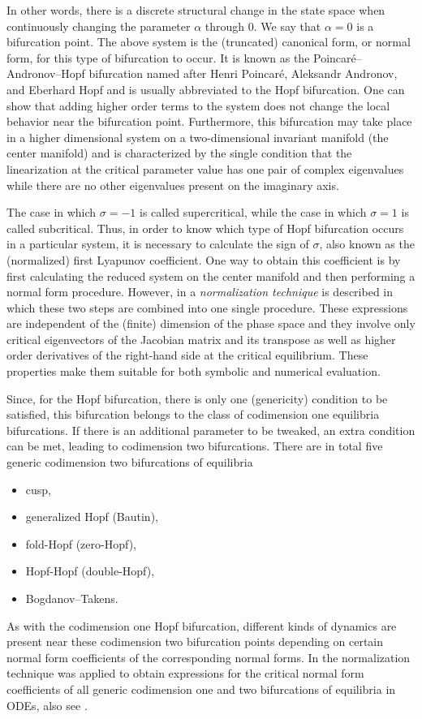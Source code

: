 In other words, there is a discrete structural change in the state space when
continuously changing the parameter $\alpha$ through $0$. We say that
$\alpha=0$ is a bifurcation point. The above system is the (truncated)
canonical form, or normal form, for this type of bifurcation to occur. It is
known as the Poincar\'e–Andronov–Hopf bifurcation named after Henri Poincar\'e,
Aleksandr Andronov, and Eberhard Hopf and is usually abbreviated to the Hopf
bifurcation. One can show that adding higher order terms to the system does
not change the local behavior near the bifurcation point. Furthermore, this
bifurcation may take place in a higher dimensional system on a two-dimensional
invariant manifold (the center manifold) and is characterized by the single
condition that the linearization at the critical parameter value has one pair
of complex eigenvalues while there are no other eigenvalues present on the
imaginary axis. 

The case in which $\sigma=-1$ is called supercritical, while the case in which
$\sigma=1$ is called subcritical. Thus, in order to know which type of Hopf
bifurcation occurs in a particular system, it is necessary to calculate the
sign of $\sigma$, also known as the (normalized) first Lyapunov coefficient. One way to
obtain this coefficient is by first calculating the reduced system on the
center manifold and then performing a normal form procedure. However, in
\cite{Coullet1983competinginstabilities} a \emph{normalization technique} is
described in which these two steps are combined into one single procedure. These
expressions are independent of the (finite) dimension of the phase space and
they involve only critical eigenvectors of the Jacobian matrix and its
transpose as well as higher order derivatives of the right-hand side at the
critical equilibrium. These properties make them suitable for both symbolic and
numerical evaluation.

Since, for the Hopf bifurcation, there is only one (genericity) condition to be
satisfied, this bifurcation belongs to the class of codimension one equilibria
bifurcations. If there is an additional parameter to be tweaked, an extra
condition can be met, leading to codimension two bifurcations. There are in
total five generic codimension two bifurcations of equilibria
\begin{itemize}
    \item cusp,
    \item generalized Hopf (Bautin),
    \item fold-Hopf (zero-Hopf),
    \item Hopf-Hopf (double-Hopf),
    \item Bogdanov--Takens.
\end{itemize} 
As with the codimension one Hopf bifurcation, different kinds of dynamics are
present near these codimension two bifurcation points depending on certain
normal form coefficients of the corresponding normal forms. In
\cite{Kuznetsov1999} the normalization technique was applied to obtain
expressions for the critical normal form coefficients of all generic
codimension one and two bifurcations of equilibria in ODEs, also see \cite[\S
8.7]{Kuznetsov2004}. 

